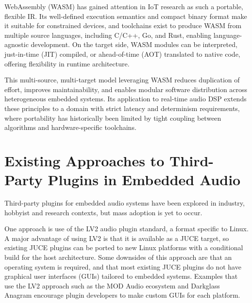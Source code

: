 WebAssembly (WASM) has gained attention in IoT research as such a portable, flexible IR\cite{10.1007/978-3-030-74296-6_27}\cite{10.1145/3593434.3593454}\cite{Rusum_2022}. Its well-defined execution semantics and compact binary format make it suitable for constrained devices, and toolchains exist to produce WASM from multiple source languages, including C/C++, Go, and Rust, enabling language-agnostic development. On the target side, WASM modules can be interpreted, just-in-time (JIT) compiled, or ahead-of-time (AOT) translated to native code, offering flexibility in runtime architecture.

This multi-source, multi-target model leveraging WASM reduces duplication of effort, improves maintainability, and enables modular software distribution across heterogeneous embedded systems. Its application to real-time audio DSP extends these principles to a domain with strict latency and determinism requirements, where portability has historically been limited by tight coupling between algorithms and hardware-specific toolchains.


\section{ Existing Approaches to Third-Party Plugins in Embedded Audio}

Third-party plugins for embedded audio systems have been explored in industry, hobbyist and research contexts, but mass adoption is yet to occur.

One approach is use of the LV2 audio plugin standard, a format specific to Linux. A major advantage of using LV2 is that it is available as a JUCE target, so existing JUCE plugins can be ported to new Linux platforms with a conditional build for the host architecture. Some downsides of this approach are that an operating system is required, and that most existing JUCE plugins do not have graphical user interfaces (GUIs) tailored to embedded systems. Examples that use the LV2 approach such as the MOD Audio ecosystem\cite{mod_audio_platform} and Darkglass Anagram\cite{darkglass_plugin_dev_setup} encourage plugin developers to make custom GUIs for each platform.

